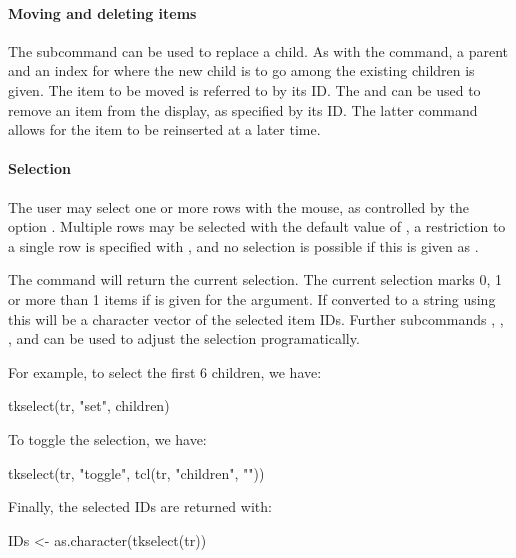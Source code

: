 \paragraph{Moving and deleting items}
The  subcommand can be used to replace a
child. As with the  command, a parent and an index for
where the new child is to go among the existing children is given. The
item to be moved is referred to by its ID. The
 and 
can be used to remove an item from the display, as specified by its
ID. The latter command allows for the item to be reinserted at a later
time.


\paragraph{Selection}
The user may select one or more rows with the mouse, as controlled by
the option . Multiple rows may be
selected with the default value of , a restriction to
a single row is specified with , and no selection is
possible if this is given as .

The  command will return the current
selection. The current selection marks 0, 1 or more than 1 items if
 is given for the  argument.  If
converted to a string using  this will be a
character vector of the selected item IDs. Further subcommands
, , , and  can be used
to adjust the selection programatically.

For example, to select the first 6 children, we have:
\begin{Schunk}
\begin{Sinput}
 tkselect(tr, "set", children)
\end{Sinput}
\end{Schunk}
%
To toggle the selection, we have:
\begin{Schunk}
\begin{Sinput}
 tkselect(tr, "toggle", tcl(tr, "children", ""))
\end{Sinput}
\end{Schunk}
%
Finally, the selected IDs are returned with:
\begin{Schunk}
\begin{Sinput}
 IDs <- as.character(tkselect(tr))
\end{Sinput}
\end{Schunk}

